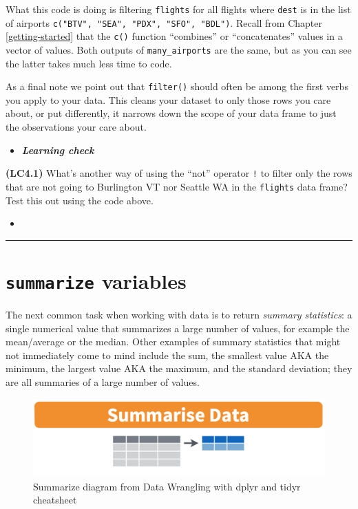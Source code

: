 \documentclass[12pt, krantz2,]{krantz}
\newenvironment{rmdblock}[1]
  {\begin{shaded*}
  \begin{itemize}
  \renewcommand{\labelitemi}{
    \raisebox{-.7\height}[0pt][0pt]{
    }
  }
  \item
  }
  {
  \end{itemize}
  \end{shaded*}
  }
\newenvironment{learncheck}
  {\begin{rmdblock}{warning}}
  {\end{rmdblock}}
\begin{document}
What this code is doing is filtering \texttt{flights} for all flights where \texttt{dest} is in the list of airports \texttt{c("BTV",\ "SEA",\ "PDX",\ "SFO",\ "BDL")}. Recall from Chapter \ref{getting-started} that the \texttt{c()} function ``combines'' or ``concatenates'' values in a vector of values. Both outputs of \texttt{many\_airports} are the same, but as you can see the latter takes much less time to code.

As a final note we point out that \texttt{filter()} should often be among the first verbs you apply to your data. This cleans your dataset to only those rows you care about, or put differently, it narrows down the scope of your data frame to just the observations your care about.

\begin{learncheck}
\textbf{\emph{Learning check}}
\end{learncheck}

\textbf{(LC4.1)} What's another way of using the ``not'' operator \texttt{!} to filter only the rows that are not going to Burlington VT nor Seattle WA in the \texttt{flights} data frame? Test this out using the code above.

\begin{learncheck}

\end{learncheck}

\begin{center}\rule{0.5\linewidth}{\linethickness}\end{center}

\hypertarget{summarize}{%
\section{\texorpdfstring{\texttt{summarize} variables}{summarize variables}}\label{summarize}}

The next common task when working with data is to return \emph{summary statistics}: a single numerical value that summarizes a large number of values, for example the mean/average or the median. Other examples of summary statistics that might not immediately come to mind include the sum, the smallest value AKA the minimum, the largest value AKA the maximum, and the standard deviation; they are all summaries of a large number of values.

\begin{figure}

{\centering \includegraphics[width=\textwidth]{images/summarize1} 

}

\caption{Summarize diagram from Data Wrangling with dplyr and tidyr cheatsheet}\label{fig:sum1}
\end{figure}
\end{document}
